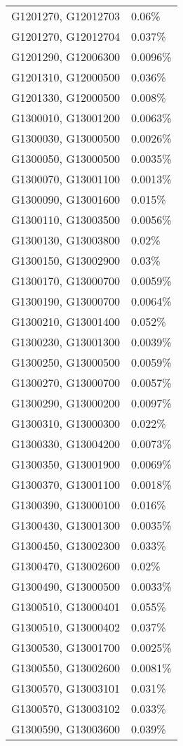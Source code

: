\begin{longtable}[]{@{}ll@{}}
G1201270, G12012703 & 0.06\% \\
G1201270, G12012704 & 0.037\% \\
G1201290, G12006300 & 0.0096\% \\
G1201310, G12000500 & 0.036\% \\
G1201330, G12000500 & 0.008\% \\
G1300010, G13001200 & 0.0063\% \\
G1300030, G13000500 & 0.0026\% \\
G1300050, G13000500 & 0.0035\% \\
G1300070, G13001100 & 0.0013\% \\
G1300090, G13001600 & 0.015\% \\
G1300110, G13003500 & 0.0056\% \\
G1300130, G13003800 & 0.02\% \\
G1300150, G13002900 & 0.03\% \\
G1300170, G13000700 & 0.0059\% \\
G1300190, G13000700 & 0.0064\% \\
G1300210, G13001400 & 0.052\% \\
G1300230, G13001300 & 0.0039\% \\
G1300250, G13000500 & 0.0059\% \\
G1300270, G13000700 & 0.0057\% \\
G1300290, G13000200 & 0.0097\% \\
G1300310, G13000300 & 0.022\% \\
G1300330, G13004200 & 0.0073\% \\
G1300350, G13001900 & 0.0069\% \\
G1300370, G13001100 & 0.0018\% \\
G1300390, G13000100 & 0.016\% \\
G1300430, G13001300 & 0.0035\% \\
G1300450, G13002300 & 0.033\% \\
G1300470, G13002600 & 0.02\% \\
G1300490, G13000500 & 0.0033\% \\
G1300510, G13000401 & 0.055\% \\
G1300510, G13000402 & 0.037\% \\
G1300530, G13001700 & 0.0025\% \\
G1300550, G13002600 & 0.0081\% \\
G1300570, G13003101 & 0.031\% \\
G1300570, G13003102 & 0.033\% \\
G1300590, G13003600 & 0.039\% \\

\end{longtable}
